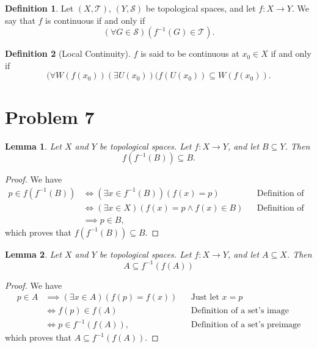\documentclass[10pt,a4paper]{article}
\author{Jeremiah Givens}
\theoremstyle{theorem}
\newtheorem{lemma}{Lemma}
\theoremstyle{definition}
\newtheorem{definition}{Definition}
\newcommand{\Tau}{\mathcal{T}}
\begin{document}
\begin{definition}
Let $(X, \Tau)$, $(Y, \mathcal{S})$ be topological spaces, and let $f : X \to Y$. We say that $f$ is continuous if and only if 
\begin{equation*}
(\forall G \in \mathcal{S})(f^{-1}(G) \in \Tau).
\end{equation*}
\end{definition}

\begin{definition}[Local Continuity] $f$ is said to be continuous at $x_0 \in X$ if and only if 
\begin{equation*}
(\forall W(f(x_0))(\exists U(x_0))(f(U(x_0)) \subseteq W(f(x_0)).
\end{equation*}
\end{definition}

\section*{Problem 7}
\begin{lemma}
Let $X$ and $Y$ be topological spaces. Let $f:X \to Y$, and let $B \subseteq Y$. Then
\begin{equation*}
f(f^{-1}(B)) \subseteq B.
\end{equation*}
\end{lemma}

\begin{proof}
We have
\begin{align*}
p \in f(f^{-1}(B)) &\iff (\exists x \in f^{-1}(B))(f(x) = p) &&\text{Definition of a set's image}\\
&\iff (\exists x \in X)(f(x) = p \land f(x) \in B)&&\text{Definition of a set's preimage}\\
&\implies p \in B,
\end{align*}
which proves that $f(f^{-1}(B)) \subseteq B$.
\end{proof}

\begin{lemma}
Let $X$ and $Y$ be topological spaces. Let $f:X \to Y$, and let $A \subseteq X$. Then
\begin{equation*}
A \subseteq f^{-1}(f(A))
\end{equation*}
\end{lemma}

\begin{proof}
We have
\begin{align*}
p \in A &\implies (\exists x \in A)(f(p) = f(x)) &&\text{Just let } x = p\\
&\iff f(p) \in f(A)&&\text{Definition of a set's image}\\
&\iff p \in f^{-1}(f(A)),&&\text{Definition of a set's preimage}
\end{align*}
which proves that $A \subseteq f^{-1}(f(A))$.
\end{proof}
\end{document}
